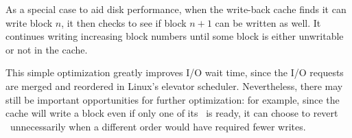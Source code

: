 As a special case to aid disk performance, when the write-back cache finds
it can write block $n$, it then checks to see if block $n+1$ can be written as
well.
%
It continues writing increasing block numbers until some block is either
unwritable or not in the cache.
%
\begin{comment}
The block itself is also marked \PInfst, so that only
one version of its data will be in flight at a time. (This whole procedure is
basically the buffer cache \textit{Write block} action.)
\end{comment}
%
This simple optimization greatly improves I/O wait time, since the I/O
requests are merged and reordered in Linux's elevator scheduler.
%
Nevertheless, there may still be important opportunities for further
optimization: for example, since the cache will write a block even if only
one of its \patches\ is ready, it can choose to revert \patches\
unnecessarily when a different order would have required fewer writes.


\begin{comment}
Each \patch\ on a cached block may or may not be visible to a given \module.
For example, \modules\ that respond to user requests generally view the most
current state of every block -- the block with all \patches\ applied. However, a
write-back cache may choose to write some \patches\ on a block while reverting
others, since those others currently have outstanding dependencies. In this
case, \modules\ below the write-back cache (i.e. closer to the disk) should view
those \patches\ in the reverted state. \Kudos\ provides a block revisioning
library function that automatically reverts those \patches\ that should not
be visible at a particular \module, and then re-applies them after that
\module\ is done with the block.
\end{comment}
